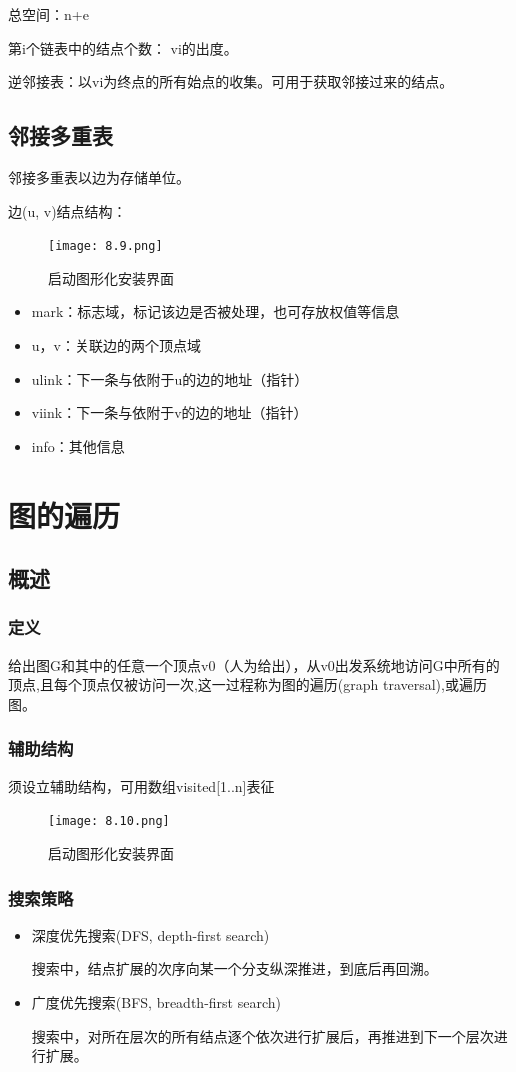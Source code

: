 \documentclass[AutoFakeBold]{LZUThesis2007}
\begin{document}
总空间：n+e

第i个链表中的结点个数： vi的出度。

逆邻接表：以vi为终点的所有始点的收集。可用于获取邻接过来的结点。
		\subsection{邻接多重表}
邻接多重表以边为存储单位。

边(u, v)结点结构：
\begin{figure}[H]
    \centering
    \texttt{[image: 8.9.png]}
    \caption{启动图形化安装界面}
    \label{fig_install_texlive}
\end{figure}
\begin{itemize}
	\item mark：标志域，标记该边是否被处理，也可存放权值等信息
	\item u，v：关联边的两个顶点域
	\item ulink：下一条与依附于u的边的地址（指针）
	\item viink：下一条与依附于v的边的地址（指针）
	\item info：其他信息
\end{itemize}


	\section{图的遍历}
		\subsection{概述}
			\subsubsection{定义}
给出图G和其中的任意一个顶点v0（人为给出），从v0出发系统地访问G中所有的顶点,且每个顶点仅被访问一次,这一过程称为图的遍历(graph traversal),或遍历图。
			\subsubsection{辅助结构}
须设立辅助结构，可用数组visited[1..n]表征
\begin{figure}[H]
    \centering
    \texttt{[image: 8.10.png]}
    \caption{启动图形化安装界面}
    \label{fig_install_texlive}
\end{figure}
			\subsubsection{搜索策略}
\begin{itemize}
	\item 深度优先搜索(DFS, depth-first search)

搜索中，结点扩展的次序向某一个分支纵深推进，到底后再回溯。
	\item 广度优先搜索(BFS, breadth-first search)

搜索中，对所在层次的所有结点逐个依次进行扩展后，再推进到下一个层次进行扩展。
\end{itemize}
\end{document}
